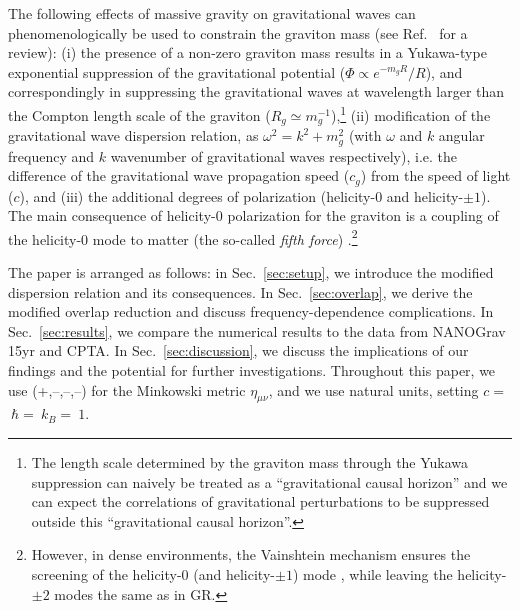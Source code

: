 \documentclass[prd,aps,psfig,nofootinbib,nobibnotes,superscriptaddress,preprintnumbers,times]{revtex4-2}\setlength{\topmargin}{-14mm}
\begin{document}
The following effects of massive gravity on gravitational waves can phenomenologically be used to constrain the graviton mass (see Ref.\ \cite{deRham:2016nuf} for a review):
(i) the presence of a non-zero graviton mass results in a Yukawa-type exponential suppression of the gravitational potential ($\Phi \propto e^{-m_gR}/R$), and correspondingly in suppressing the gravitational waves at wavelength larger than the Compton length scale of the graviton ($R_g \simeq m_g^{-1}$),\footnote{The length scale determined by the graviton mass through the Yukawa suppression can naively be treated as a ``gravitational causal horizon'' and we can expect the correlations of gravitational perturbations to be suppressed outside this ``gravitational causal horizon''.}
(ii) modification of the gravitational wave dispersion relation, as $\omega^2 = k^2 +m_g^2$ (with $\omega$ and $k$ angular frequency and $k$ wavenumber of gravitational waves respectively), i.e. the difference of the gravitational wave propagation speed ($c_g$) from the speed of light ($c$), and
(iii) the additional degrees of polarization (helicity-$0$ and helicity-$\pm 1$). The main consequence of helicity-$0$ polarization for the graviton is a coupling of the helicity-0 mode to matter (the so-called {\it fifth force}) \cite{deRham:2014naa}.\footnote{{However, in dense environments, the Vainshtein mechanism \cite{Vainshtein:1972sx} ensures the screening of the helicity-0 (and helicity-$\pm 1$) mode \cite{deRham:2012fw,
Bloomfield:2014zfa,Falck:2015rsa,Falck:2014jwa,Kase:2015zva,Koyama:2015oma}, while leaving the helicity-$\pm 2$ modes the same as in GR.}}

The paper is arranged as follows: in Sec.\ \ref{sec:setup}, we introduce the modified dispersion relation and its consequences. In Sec.\ \ref{sec:overlap}, we derive the modified overlap reduction and discuss frequency-dependence complications. In Sec.\ \ref{sec:results}, we compare the numerical results to the data from NANOGrav 15yr and CPTA. In Sec.\ \ref{sec:discussion}, we discuss the implications of our findings and the potential for further investigations. Throughout this paper, we use  (+,--,--,--) for the Minkowski metric $\eta_{\mu\nu}$, and we use natural units, setting $c = $$\ \hbar = $$\ k_B = $$\ 1$. 
\end{document}
